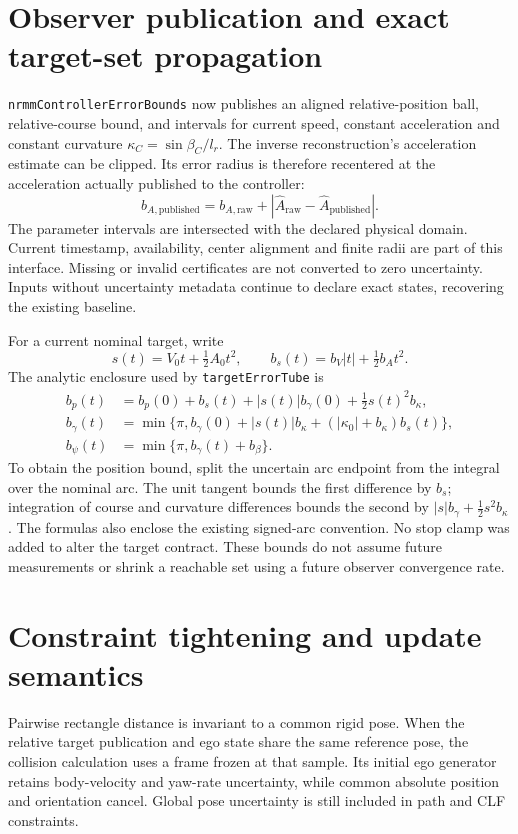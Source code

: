 \documentclass[11pt]{article}
\begin{document}
\section{Observer publication and exact target-set propagation}
\texttt{nrmmControllerErrorBounds} now publishes an aligned relative-position
ball, relative-course bound, and intervals for current speed, constant
acceleration and constant curvature $\kappa_C=\sin\beta_C/l_r$. The inverse
reconstruction's acceleration estimate can be clipped. Its error radius is
therefore recentered at the acceleration actually published to the controller:
\[
 b_{A,\mathrm{published}}
 =b_{A,\mathrm{raw}}+|\widehat A_{\mathrm{raw}}-\widehat A_{\mathrm{published}}|.
\]
The parameter intervals are intersected with the declared physical domain.
Current timestamp, availability, center alignment and finite radii are part
of this interface. Missing or invalid certificates are not converted to zero
uncertainty. Inputs without uncertainty metadata continue to declare exact
states, recovering the existing baseline.

For a current nominal target, write
\[
 s(t)=V_0t+\tfrac12 A_0t^2,\qquad
 b_s(t)=b_V|t|+\tfrac12b_At^2.
\]
The analytic enclosure used by \texttt{targetErrorTube} is
\begin{align*}
 b_p(t)&=b_p(0)+b_s(t)+|s(t)|b_\gamma(0)+\tfrac12s(t)^2b_\kappa,\\
 b_\gamma(t)&=\min\{\pi,b_\gamma(0)+|s(t)|b_\kappa
                       +( |\kappa_0|+b_\kappa)b_s(t)\},\\
 b_\psi(t)&=\min\{\pi,b_\gamma(t)+b_\beta\}.
\end{align*}
To obtain the position bound, split the uncertain arc endpoint from the
integral over the nominal arc. The unit tangent bounds the first difference
by $b_s$; integration of course and curvature differences bounds the second
by $|s|b_\gamma+\tfrac12s^2b_\kappa$. The formulas also enclose the existing
signed-arc convention. No stop clamp was added to alter the target contract.
These bounds do not assume future measurements or shrink a reachable set
using a future observer convergence rate.

\section{Constraint tightening and update semantics}
Pairwise rectangle distance is invariant to a common rigid pose. When the
relative target publication and ego state share the same reference pose,
the collision calculation uses a frame frozen at that sample. Its initial
ego generator retains body-velocity and yaw-rate uncertainty, while common
absolute position and orientation cancel. Global pose uncertainty is still
included in path and CLF constraints.
\end{document}
